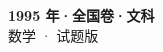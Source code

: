 \documentclass[zihao=-4, a4paper]{ctexart}
\begin{document}
\begin{center}
  {\Large\bfseries 1995 年·全国卷·文科}\\[4pt]
  {\large 数学 · 试题版}
\end{center}
\medskip
{}

\end{document}
